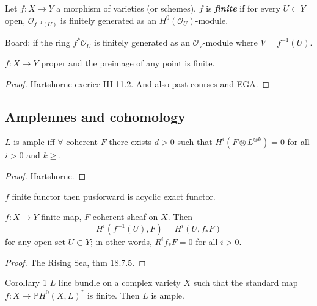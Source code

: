 \begin{defn}\leavevmode
	Let $f:X\longrightarrow Y$ a morphism of varieties (or schemes). $f$ is \textit{\textbf{finite}} if for every $U\subset Y$ open, $\mathcal{O}_{f^{-1}(U)}$ is finitely generated as an $H^{0}(\mathcal{O}_U)$-module.

	{\color{5}Board:} if the ring $f^*\mathcal{O}_U$ is finitely generated as an $\mathcal{O}_V$-module where $V=f^{-1}(U)$.
\end{defn}

\begin{thm}\leavevmode
	$f:X\longrightarrow Y$ proper and the preimage of any point is finite.
\end{thm}

\begin{proof}\leavevmode
	Hartshorne exerice III 11.2. And also past courses and EGA.
\end{proof}

\subsection{Amplennes and cohomology}

\begin{thm}\leavevmode
	$L$ is ample iff $\forall $ coherent $F$ there exists $d>0$ such that  $H^{i}(F\otimes L^{\otimes k})=0$ for all $i>0$ and  $k\geq $.
\end{thm}

\begin{proof}\leavevmode
	Hartshorne.
\end{proof}

\begin{thm}\leavevmode
$f$ finite functor then pusforward is acyclic exact functor.

$f:X\longrightarrow Y$ finite map, $F$ coherent sheaf on $X$. Then
\[H^{i}(f^{-1}(U),F)=H^{i}(U,f_* F)\]
for any open set $U\subset Y$; in other words, $R^if_* F=0$ for all $i>0$.
\end{thm}

\begin{proof}\leavevmode
	The Rising Sea, thm 18.7.5.
\end{proof}

\begin{thing4}{Corollary 1}\leavevmode
	$L$ line bundle on a complex variety $X$ such that the standard map $f:X\longrightarrow \mathbb{P}H^{0}(X,L)^*$ is finite. Then $L$ is ample.
\end{thing4}

